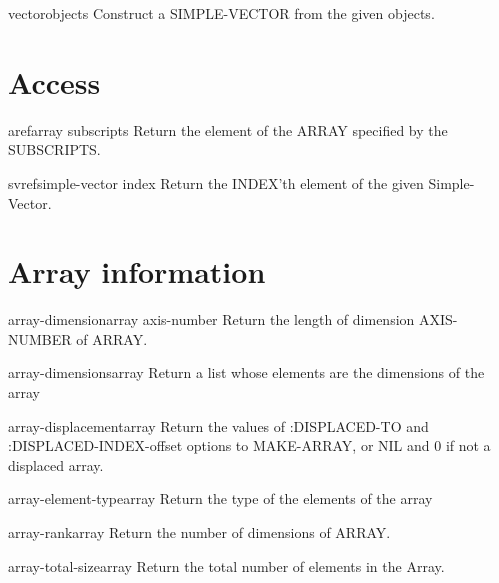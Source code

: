 \documentclass[10pt,english]{book}
\begin{document}
\begin{function}{vector}{\rest objects}
  Construct a SIMPLE-VECTOR from the given objects.
\end{function}

\section{Access}
\label{sec:array-access}

\begin{accessor}{aref}{array \rest subscripts}
  Return the element of the ARRAY specified by the SUBSCRIPTS.
\end{accessor}

\begin{accessor}{svref}{simple-vector index}
  Return the INDEX'th element of the given Simple-Vector.
\end{accessor}

\section{Array information}
\label{sec:array-information}

\begin{function}{array-dimension}{array axis-number}
  Return the length of dimension AXIS-NUMBER of ARRAY.
\end{function}

\begin{function}{array-dimensions}{array}
  Return a list whose elements are the dimensions of the array
\end{function}

\begin{function}{array-displacement}{array}
  Return the values of :DISPLACED-TO and :DISPLACED-INDEX-offset
   options to MAKE-ARRAY, or NIL and 0 if not a displaced array.
\end{function}

\begin{function}{array-element-type}{array}
  Return the type of the elements of the array
\end{function}

\begin{function}{array-rank}{array}
  Return the number of dimensions of ARRAY.
\end{function}

\begin{function}{array-total-size}{array}
  Return the total number of elements in the Array.
\end{function}
\end{document}
